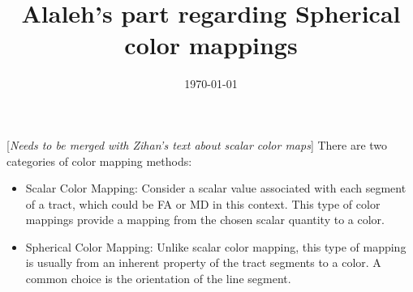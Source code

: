 \documentclass{article}
\title{Alaleh's part regarding Spherical color mappings}
\date{\today}
\newcommand{\saeed}[1]{{\color{red}[\textit{#1}]}}
\begin{document}
\maketitle

\saeed{Needs to be merged with Zihan's text about scalar color maps} There are two categories of color mapping methods:
\begin{itemize}
	\item Scalar Color Mapping: Consider a scalar value associated with each segment of a tract, which could  be FA or MD in this context. This type of color mappings provide a mapping from the chosen scalar quantity to a color. 
	\item Spherical Color Mapping: Unlike scalar color mapping, this type of mapping is usually from an inherent property of the tract segments to a color. A common choice is the orientation of the line segment. 
\end{itemize}
\end{document}
